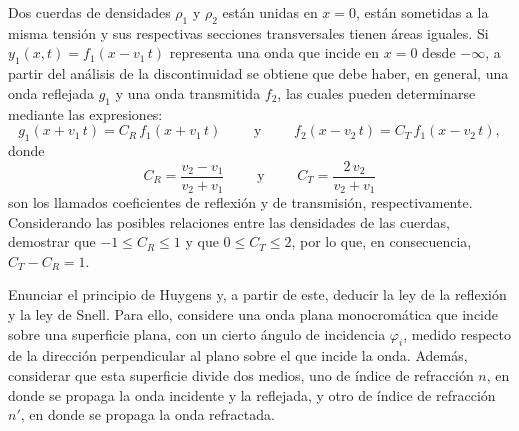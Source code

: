 \documentclass[addpoints]{exam}
\newcommand{\ver}[1]{\hat{\mathbf{#1}}}
\begin{document}
\begin{questions}

    \question Dos cuerdas de densidades $\rho_1$ y $\rho_2$ están unidas en $x=0$, están sometidas a la misma tensión y sus respectivas secciones transversales tienen áreas iguales. Si $y_1 (x,t) = f_1 \left(x - v_1 \, t\right)$ representa una onda que incide en $x=0$ desde $-\infty$, a partir del análisis de la discontinuidad se obtiene que debe haber, en general, una onda reflejada $g_1$ y una onda transmitida $f_2$, las cuales pueden determinarse mediante las expresiones: $$ g_1 \left(x + v_1 \, t\right) = C_R \, f_1 \left(x + v_1 \, t\right) \qquad \text{ y } \qquad f_2 \left(x - v_2 \, t\right) = C_T \, f_1 \left(x - v_2 \, t\right), $$ donde $$ C_R = \frac{v_2 - v_1}{v_2 + v_1} \qquad \text{ y } \qquad C_T = \frac{2 \, v_2}{v_2 + v_1} $$ son los llamados coeficientes de reflexión y de transmisión, respectivamente. Considerando las posibles relaciones entre las densidades de las cuerdas, demostrar que $-1 \le C_R \le 1$ y que $0 \le C_T \le 2$, por lo que, en consecuencia, $C_T - C_R = 1$.

    \question Enunciar el principio de Huygens y, a partir de este, deducir la ley de la reflexión y la ley de Snell. Para ello, considere una onda plana monocromática que incide sobre una superficie plana, con un cierto ángulo de incidencia $\varphi_i$, medido respecto de la dirección perpendicular al plano sobre el que incide la onda. Además, considerar que esta superficie divide dos medios, uno de índice de refracción $n$, en donde se propaga la onda incidente y la reflejada, y otro de índice de refracción $n'$, en donde se propaga la onda refractada.


\end{questions}
\end{document}
